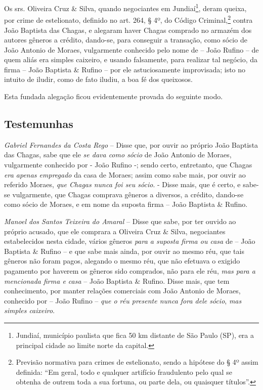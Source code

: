 {\asterisc{}

Os srs. Oliveira Cruz \& Silva, quando negociantes em
Jundiaí\footnote{ Jundiaí, município paulista que fica 50 km distante
  de São Paulo (SP), era a principal cidade ao limite norte da capital.},
deram queixa, por crime de estelionato, definido no art. 264, § 4º, do
Código Criminal,\footnote{ Previsão normativa para crimes de
  estelionato, sendo a hipótese do § 4º assim definida: ``Em geral, todo
  e qualquer artifício fraudulento pelo qual se obtenha de outrem toda a
  sua fortuna, ou parte dela, ou quaisquer títulos''.} contra João
Baptista das Chagas, e alegaram haver Chagas comprado no armazém dos
autores gêneros a crédito, dando-se, para conseguir a transação, como
sócio de João Antonio de Moraes, vulgarmente conhecido pelo nome de --
João Rufino -- de quem aliás era simples caixeiro, e usando falsamente,
para realizar tal negócio, da firma -- João Baptista \& Rufino -- por
ele astuciosamente improvisada; isto no intuito de iludir, como de fato
iludiu, a boa fé dos queixosos.

Esta fundada alegação ficou evidentemente provada do seguinte modo.

\subsection{Testemunhas}

\emph{Gabriel Fernandes da Costa Rego} -- Disse que, por ouvir ao
próprio João Baptista das Chagas, sabe que ele \emph{se dava como sócio}
de João Antonio de Moraes, vulgarmente conhecido por - João Rufino -;
sendo certo, entretanto, que Chagas \emph{era apenas empregado} da casa
de Moraes; assim como sabe mais, por ouvir ao referido Moraes, \emph{que
Chagas nunca foi seu sócio}. - Disse mais, que é certo, e sabe-se
vulgarmente, que Chagas comprava gêneros a diversos, a crédito, dando-se
como sócio de Moraes, e em nome da suposta firma -- João Baptista \&
Rufino.

\emph{Manoel dos Santos Teixeira do Amaral} -- Disse que sabe, por ter
ouvido ao próprio acusado, que ele comprara a Oliveira Cruz \& Silva,
negociantes estabelecidos nesta cidade, vários gêneros \emph{para a
suposta firma ou casa} de -- João Baptista \& Rufino -- e que sabe mais
ainda, por ouvir ao mesmo réu, que tais gêneros não foram pagos,
alegando o mesmo réu, que não efetuava o exigido pagamento por haverem
os gêneros sido comprados, não para ele réu, \emph{mas para a mencionada
firma e casa} -- João Baptista \& Rufino. Disse mais, que tem
conhecimento, por manter relações comerciais com João Antonio de Moraes,
conhecido por -- João Rufino -- \emph{que o réu presente nunca fora dele
sócio}, \emph{mas simples caixeiro}.

}
